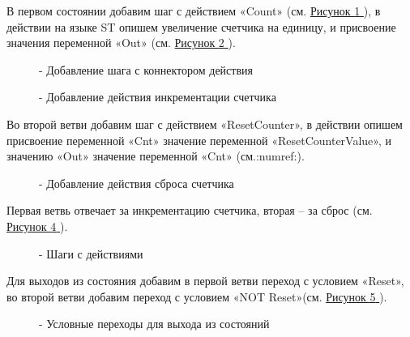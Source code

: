 \documentclass[letterpaper,10pt,russian]{sphinxmanual}
\begin{document}
В первом состоянии добавим шаг с действием «Count» (см. \hyperref[usage_guide/work_with_project:image174]{Рисунок \ref{usage_guide/work_with_project:image174} }), в
действии на языке ST опишем увеличение счетчика на единицу, и присвоение
значения переменной «Out» (см. \hyperref[usage_guide/work_with_project:image175]{Рисунок \ref{usage_guide/work_with_project:image175} }).
\begin{figure}[htbp]
\centering
\capstart

\noindent{}
\caption{- Добавление шага с коннектором действия}\label{usage_guide/work_with_project:image174}\end{figure}
\begin{figure}[htbp]
\centering
\capstart

\noindent{}
\caption{- Добавление действия инкрементации счетчика}\label{usage_guide/work_with_project:image175}\end{figure}

Во второй ветви добавим шаг с действием «ResetCounter», в действии
опишем присвоение переменной «Cnt» значение переменной
«ResetCounterValue», и значению «Out» значение переменной «Cnt» (см.:numref:).
\begin{figure}[htbp]
\centering
\capstart

\noindent{}
\caption{- Добавление действия сброса счетчика}\label{usage_guide/work_with_project:image176}\end{figure}

Первая ветвь отвечает за инкрементацию счетчика, вторая – за сброс (см. \hyperref[usage_guide/work_with_project:image177]{Рисунок \ref{usage_guide/work_with_project:image177} }).
\begin{figure}[htbp]
\centering
\capstart

\noindent{}
\caption{- Шаги с действиями}\label{usage_guide/work_with_project:image177}\end{figure}

Для выходов из состояния добавим в первой ветви переход с условием
«Reset», во второй ветви добавим переход с условием «NOT Reset»(см. \hyperref[usage_guide/work_with_project:image178]{Рисунок \ref{usage_guide/work_with_project:image178} }).
\begin{figure}[htbp]
\centering
\capstart

\noindent{}
\caption{- Условные переходы для выхода из состояний}\label{usage_guide/work_with_project:image178}\end{figure}
\end{document}
